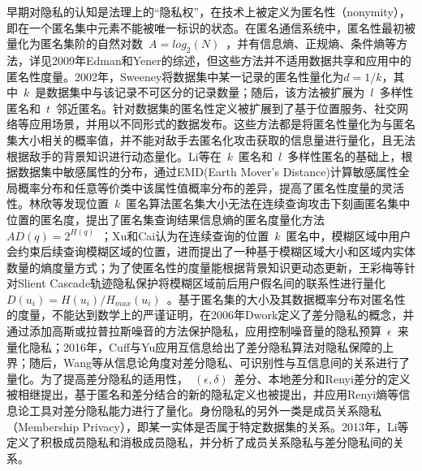 早期对隐私的认知是法理上的“隐私权”，在技术上被定义为匿名性（nonymity），即在一个匿名集中元素不能被唯一标识的状态。在匿名通信系统中，匿名性最初被量化为匿名集阶的自然对数~$A=log_2(N)$~\cite{reiter1998crowds}，并有信息熵、正规熵、条件熵等方法，详见2009年Edman和Yener的综述\cite{edman2009anonymity}，但这些方法并不适用数据共享和应用中的匿名性度量。2002年，Sweeney\cite{sweeney2002k}将数据集中某一记录的匿名性量化为$d=1/k$，其中~$k$~是数据集中与该记录不可区分的记录数量；随后，该方法被扩展为~$l$~多样性匿名\cite{machanavajjhala2007l}和~$t$~邻近匿名\cite{li2007t}。针对数据集的匿名性定义被扩展到了基于位置服务\cite{niu2014achieving}、社交网络\cite{campan2008data}等应用场景，并用以不同形式的数据发布\cite{wong2006anonymity,ying2009comparisons}。这些方法都是将匿名性量化为与匿名集大小相关的概率值，并不能对敌手去匿名化攻击获取的信息量进行量化，且无法根据敌手的背景知识进行动态量化。Li等\cite{li2010closeness}在~$k$~匿名和~$l$~多样性匿名的基础上，根据数据集中敏感属性的分布，通过EMD(Earth Mover's Distance)计算敏感属性全局概率分布和任意等价类中该属性值概率分布的差异，提高了匿名性度量的灵活性。林欣等\cite{lin2009lbs}发现位置~$k$~匿名算法匿名集大小无法在连续查询攻击下刻画匿名集中位置的匿名度，提出了匿名集查询结果信息熵的匿名度量化方法~$AD(q)=2^{H(q)}$~；Xu和Cai\cite{xu2007location}认为在连续查询的位置~$k$~匿名中，模糊区域中用户会约束后续查询模糊区域的位置，进而提出了一种基于模糊区域大小和区域内实体数量的熵度量方式；为了使匿名性的度量能根据背景知识更动态更新，王彩梅等\cite{wang2012location}针对Slient Cascade轨迹隐私保护将模糊区域前后用户假名间的联系性进行量化~$D(u_i)=H(u_i)/H_{max}(u_i)$~。基于匿名集的大小及其数据概率分布对匿名性的度量，不能达到数学上的严谨证明，在2006年Dwork\cite{dwork2006differential}定义了差分隐私的概念，并通过添加高斯或拉普拉斯噪音的方法保护隐私，应用控制噪音量的隐私预算~$\epsilon$~来量化隐私；2016年，Cuff与Yu\cite{cuff2016differential}应用互信息给出了差分隐私算法对隐私保障的上界；随后，Wang等\cite{wang2016relation}从信息论角度对差分隐私、可识别性与互信息间的关系进行了量化。为了提高差分隐私的适用性，~$(\epsilon,\delta)$~差分、本地差分\cite{kairouz2014extremal}和Renyi差分\cite{mironov2017renyi}的定义被相继提出，基于匿名和差分结合的新的隐私定义也被提出\cite{holohan2017k}，并应用Renyi熵等信息论工具对差分隐私能力进行了量化。身份隐私的另外一类是成员关系隐私（Membership Privacy），即某一实体是否属于特定数据集的关系。2013年，Li等\cite{li2013membership}定义了积极成员隐私和消极成员隐私，并分析了成员关系隐私与差分隐私间的关系。

